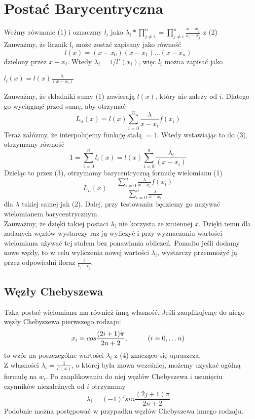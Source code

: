 \documentclass[11pt, wide]{article}
\begin{document}
\section{Postać Barycentryczna}
Weźmy równanie (1) i oznaczmy $l_i$ jako $\lambda_i *\prod_{j\neq i}^{n} = \prod_{j\neq i}^{n}\frac{x - x_j}{x_i - x_j} $ z (2)
\\ Zauważmy, że licznik $l_i$ może zostać zapisany jako równość
\begin{equation*}
    l(x) = (x - x_0)(x - x_1)\ldots(x - x_n)
\end{equation*} 
dzielony przez $x - x_i$. Wtedy $\lambda_i = 1/l'(x_i)$, więc $l_i$ można zapisać jako
\begin{center}
    $l_i(x) = l(x)\frac{\lambda_i}{(x - x_i)}$
\end{center}
Zauważmy, że składniki sumy (1) zawierają $l(x)$, który nie zależy od $i$. Dlatego go
wyciągnąć przed sumę, aby otrzymać
\begin{equation}
    L_n(x) = l(x)\sum_{i=0}^{n}\frac{\lambda}{x - x_i}f(x_i)
\end{equation}
Teraz załózmy, że interpolujemy funkcję stałą $ = 1$. Wtedy wstawiając to do (3),
otrzymamy równość                           
\begin{equation*}
    1 = \sum_{i=0}^{n}l_i(x) = l(x)\sum_{i=0}^{n}\frac{\lambda_i}{(x - x_i)}
\end{equation*}
Dzieląc to przez (3), otrzymamy \textsf{barycentryczną formułę} wielomianu (1)
\begin{equation}
    L_n(x) = \frac{\sum_{i=0}^{n}\frac{\lambda}{x - x_i}f(x_i)}{\sum_{i=0}^{n}\frac{\lambda}{x - x_i}}
\end{equation}
dla $\lambda$ takiej samej jak (2). Dalej, przy testowaniu będziemy go nazywać 
\textsf{wielomianem barycentrycznym}.
\\
Zauważmy, że dzięki takiej postaci $\lambda_i$ nie korzysta ze zmiennej $x$.
Dzięki temu dla zadanych węzłów wystarczy raz ją wyliczyć i przy wyznaczaniu wartości
wielomianu używać tej stałem bez ponawiania obliczeń. Ponadto jeśli 
dodamy nowe wężły, to w celu wyliczenia nowej wartości $\lambda_i$, wystarczy
przemnożyć ją przez odpowiedni iloraz $\frac{1}{t_i - t_j}$.
\subsection{Węzły Chebyszewa}
Taka postać wielomianu ma również inną własność. Jeśli zaaplikujemy
do niego węzły Chebyszewa pierwszego rodzaju:
\begin{equation}
x_i = cos\frac{(2i + 1)\pi}{2n + 2}, \hspace*{1cm} (i = 0, \ldots n)
\end{equation}
to wzór na poszczególne wartości $\lambda_i$ z (4) znacząco się upraszcza.
\\
Z własności $\lambda_i = \frac{1}{l'(x)}$, o której była mowa wcześniej, możemy
uzyskać ogólną formułę na $w_i$.
Po zaaplikowaniu do niej węzłów Chebyszewa i usunięciu czynników 
niezależnych od $i$ otrzymamy
\begin{equation}
    \lambda_i = (-1)^j sin\frac{(2j + 1)\pi}{2n + 2}
\end{equation}
Podobnie można postępować w przypadku węzłów Chebyszewa innego rodzaju.
\end{document}
